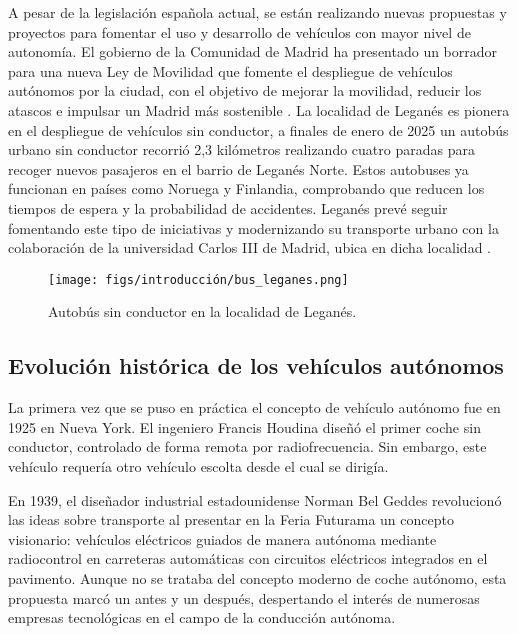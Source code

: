 A pesar de la legislación española actual, se están realizando nuevas propuestas y proyectos para fomentar el uso y desarrollo de vehículos con mayor nivel de autonomía. El gobierno de la Comunidad de Madrid ha presentado un borrador para una nueva Ley de Movilidad que fomente el despliegue de vehículos autónomos por la ciudad, con el objetivo de mejorar la movilidad, reducir los atascos e impulsar un Madrid más sostenible \cite{com-madrid}. La localidad de Leganés es pionera en el despliegue de vehículos sin conductor, a finales de enero de 2025 un autobús urbano sin conductor recorrió 2,3 kilómetros realizando cuatro paradas para recoger nuevos pasajeros en el barrio de Leganés Norte. Estos autobuses ya funcionan en países como Noruega y Finlandia, comprobando que reducen los tiempos de espera y la probabilidad de accidentes. Leganés prevé seguir fomentando este tipo de iniciativas y modernizando su transporte urbano con la colaboración de la universidad Carlos III de Madrid, ubica en dicha localidad \cite{leganes}.
\begin{figure} [ht]
\begin{center}
\texttt{[image: figs/introducción/bus\_leganes.png]}
\end{center}
\caption{Autobús sin conductor en la localidad de Leganés.}
\label{leganes-photo}
\end{figure}

\subsection{Evolución histórica de los vehículos autónomos}
\label{sec:historia}

La primera vez que se puso en práctica el concepto de vehículo autónomo fue en 1925 en Nueva York. El ingeniero Francis Houdina diseñó el primer coche sin conductor, controlado de forma remota por radiofrecuencia. Sin embargo, este vehículo requería otro vehículo escolta desde el cual se dirigía.

En 1939, el diseñador industrial estadounidense Norman Bel Geddes revolucionó las ideas sobre transporte al presentar en la Feria Futurama un concepto visionario: vehículos eléctricos guiados de manera autónoma mediante radiocontrol en carreteras automáticas con circuitos eléctricos integrados en el pavimento. Aunque no se trataba del concepto moderno de coche autónomo, esta propuesta marcó un antes y un después, despertando el interés de numerosas empresas tecnológicas en el campo de la conducción autónoma.

